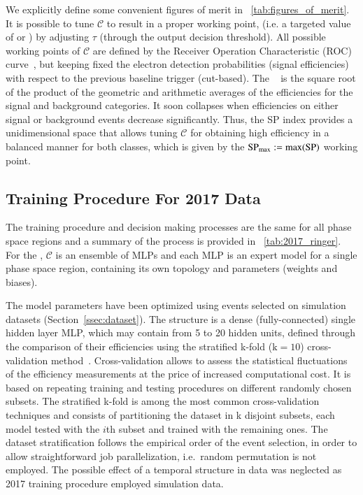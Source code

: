 We explicitly define some convenient figures of merit in \tablename~\ref{tab:figures_of_merit}. It is possible to tune $\mathcal{C}$ to result in a proper working point, (i.e. a targeted value of \pd{} or \pf{}) by adjusting $\tau$ (through the output decision threshold). All possible working points of $\mathcal{C}$ are defined by the Receiver Operation Characteristic (ROC) curve~\cite{van_trees_part1}, but keeping fixed the electron detection probabilities (signal efficiencies) with respect to the previous baseline trigger (cut-based). The \spindex{}~\cite{dos2006neural} is the square root of the product of the geometric and arithmetic averages of the efficiencies for the signal and background categories. It soon collapses when efficiencies on either signal or background events decrease significantly. Thus, the SP index provides a unidimensional space that allows tuning $\mathcal{C}$ for obtaining high efficiency in a balanced manner for both classes, which is given by the $\text{SP}_{\text{max}}{}:=\max(\text{SP}{})$ working point.









\subsection{Training Procedure For 2017 Data}\label{ssec:2017}

The training procedure and decision making processes are the same for all phase
space regions and a summary of the process is provided in
\tablename~\ref{tab:2017_ringer}. For the \rnn{}, $\mathcal{C}$ is an ensemble of
MLPs and each MLP is an expert model for a single phase space
region, containing its own topology and parameters (weights and biases).

The model parameters have been optimized using events selected on simulation datasets
(Section~\ref{ssec:dataset}). The structure is a dense (fully-connected) single
hidden layer MLP, which may contain from 5 to 20 hidden units, defined through
the comparison of their efficiencies using the stratified k-fold ($\text{k}=10$)
cross-validation method~\cite{haykin_2008}. Cross-validation allows to assess the statistical fluctuations of the efficiency measurements 
at the price of increased computational cost. It is
based on repeating training and testing procedures on different
randomly chosen subsets. The stratified k-fold is
among the most common cross-validation techniques and consists of partitioning
the dataset in k disjoint subsets, each model tested with the $i$th subset and
trained with the remaining ones. The dataset stratification follows the
empirical order of the event selection, in order to allow straightforward job
parallelization, i.e.\ random permutation is not employed. The possible effect
of a temporal structure in data was neglected as 2017 training procedure
employed simulation data.


